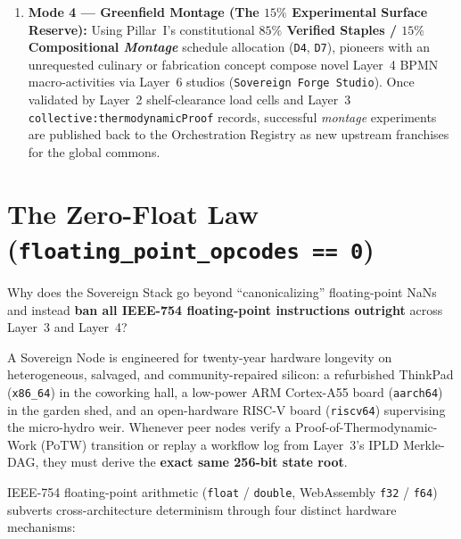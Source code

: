 \begin{enumerate}
        Orchestration Registry rank fork lineages strictly by empirical physical performance.
\item \textbf{Mode 4 --- Greenfield Montage (The $15\%$ Experimental Surface Reserve):}
        Using Pillar~I's constitutional \textbf{$85\%$ Verified Staples / $15\%$ Compositional
        \textit{Montage}} schedule allocation (\texttt{D4}, \texttt{D7}), pioneers with an
        unrequested culinary or fabrication concept compose novel Layer~4 BPMN macro-activities
        via Layer~6 studios (\texttt{Sovereign Forge Studio}). Once validated by Layer~2
        shelf-clearance load cells and Layer~3 \texttt{collective:thermodynamicProof} records,
        successful \textit{montage} experiments are published back to the Orchestration
        Registry as new upstream franchises for the global commons.
\end{enumerate}

\section{The Zero-Float Law (\texttt{floating\_point\_opcodes == 0})}
\label{sec:ch2-zero-float-law}

Why does the Sovereign Stack go beyond ``canonicalizing'' floating-point NaNs and instead
\textbf{ban all IEEE-754 floating-point instructions outright} across Layer~3 and Layer~4?

A Sovereign Node is engineered for twenty-year hardware longevity on heterogeneous,
salvaged, and community-repaired silicon: a refurbished ThinkPad (\texttt{x86\_64}) in the
coworking hall, a low-power ARM Cortex-A55 board (\texttt{aarch64}) in the garden shed, and
an open-hardware RISC-V board (\texttt{riscv64}) supervising the micro-hydro weir. Whenever
peer nodes verify a Proof-of-Thermodynamic-Work (PoTW) transition or replay a workflow log
from Layer~3's IPLD Merkle-DAG, they must derive the \textbf{exact same 256-bit state root}.

IEEE-754 floating-point arithmetic (\texttt{float} / \texttt{double}, WebAssembly
\texttt{f32} / \texttt{f64}) subverts cross-architecture determinism through four distinct
hardware mechanisms:

